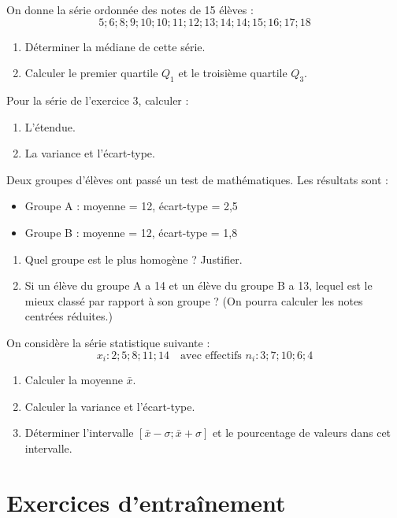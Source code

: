 \exo{}
On donne la série ordonnée des notes de 15 élèves :
\[
5; 6; 8; 9; 10; 10; 11; 12; 13; 14; 14; 15; 16; 17; 18
\]
\begin{enumerate}[label=\alph*)]
\item Déterminer la médiane de cette série.
\item Calculer le premier quartile \(Q_1\) et le troisième quartile \(Q_3\).
\end{enumerate}


\exo{}
Pour la série de l'exercice 3, calculer :
\begin{enumerate}[label=\alph*)]
\item L'étendue.
\item La variance et l'écart-type.
\end{enumerate}

\exo{}
Deux groupes d'élèves ont passé un test de mathématiques. Les résultats sont :
\begin{itemize}
\item Groupe A : moyenne = 12, écart-type = 2,5
\item Groupe B : moyenne = 12, écart-type = 1,8
\end{itemize}
\begin{enumerate}[label=\alph*)]
\item Quel groupe est le plus homogène ? Justifier.
\item Si un élève du groupe A a 14 et un élève du groupe B a 13, lequel est le mieux classé par rapport à son groupe ? (On pourra calculer les notes centrées réduites.)
\end{enumerate}

\exo{}
On considère la série statistique suivante :
\[
x_i : 2; 5; 8; 11; 14 \quad \text{avec effectifs } n_i : 3; 7; 10; 6; 4
\]
\begin{enumerate}[label=\alph*)]
\item Calculer la moyenne \(\bar{x}\).
\item Calculer la variance et l'écart-type.
\item Déterminer l'intervalle \([\bar{x} - \sigma; \bar{x} + \sigma]\) et le pourcentage de valeurs dans cet intervalle.
\end{enumerate}

\section{Exercices d'entraînement}

